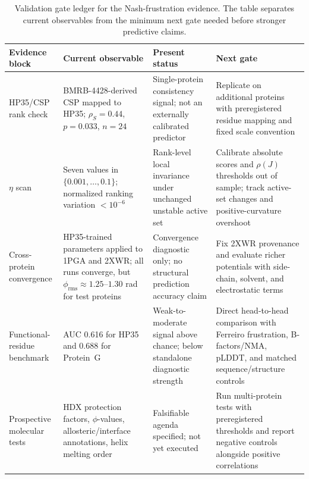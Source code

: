 \documentclass[12pt,a4paper]{article}
\theoremstyle{remark}
\begin{document}
\begin{table}[htbp]
\centering
\caption{Validation gate ledger for the Nash-frustration evidence. The table separates current observables from the minimum next gate needed before stronger predictive claims.}
\label{tab:nash-validation-ledger}
\footnotesize
\begin{tabularx}{\textwidth}{@{}L{0.21\textwidth} L{0.25\textwidth} L{0.22\textwidth} Y@{}}
\toprule
\textbf{Evidence block} & \textbf{Current observable} & \textbf{Present status} & \textbf{Next gate} \\
\midrule
HP35/CSP rank check & BMRB-4428-derived CSP mapped to HP35; $\rho_S=0.44$, $p=0.033$, $n=24$ & Single-protein consistency signal; not an externally calibrated predictor & Replicate on additional proteins with preregistered residue mapping and fixed scale convention \\
$\eta$ scan & Seven values in $\{0.001,\ldots,0.1\}$; normalized ranking variation $<10^{-6}$ & Rank-level local invariance under unchanged unstable active set & Calibrate absolute scores and $\rho(J)$ thresholds out of sample; track active-set changes and positive-curvature overshoot \\
Cross-protein convergence & HP35-trained parameters applied to 1PGA and 2XWR; all runs converge, but $\phi_{\text{rms}}\approx1.25$--$1.30$ rad for test proteins & Convergence diagnostic only; no structural prediction accuracy claim & Fix 2XWR provenance and evaluate richer potentials with side-chain, solvent, and electrostatic terms \\
Functional-residue benchmark & AUC 0.616 for HP35 and 0.688 for Protein~G & Weak-to-moderate signal above chance; below standalone diagnostic strength & Direct head-to-head comparison with Ferreiro frustration, B-factors/NMA, pLDDT, and matched sequence/structure controls \\
Prospective molecular tests & HDX protection factors, $\phi$-values, allosteric/interface annotations, helix melting order & Falsifiable agenda specified; not yet executed & Run multi-protein tests with preregistered thresholds and report negative controls alongside positive correlations \\
\bottomrule
\end{tabularx}
\end{table}
\end{document}
